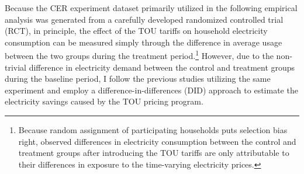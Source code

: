 Because the CER experiment dataset primarily utilized in the following empirical analysis was generated from a carefully developed randomized controlled trial (RCT), in principle, the effect of the TOU tariffs on household electricity consumption can be measured simply through the difference in average usage between the two groups during the treatment period.\footnote{Because random assignment of participating households puts selection bias right, observed differences in electricity consumption between the control and treatment groups after introducing the TOU tariffs are only attributable to their differences in exposure to the time-varying electricity prices.} However, due to the non-trivial difference in electricity demand between the control and treatment groups during the baseline period, I follow the previous studies utilizing the same experiment and employ a difference-in-differences (DID) approach to estimate the electricity savings caused by the TOU pricing program.

